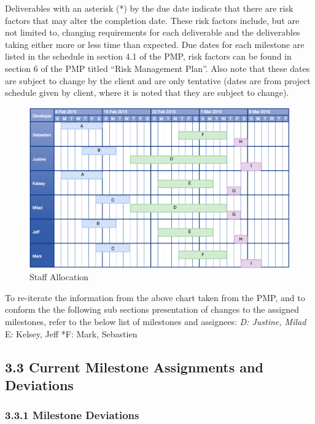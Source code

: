 \documentclass[]{article}
\begin{document}
Deliverables with an asterisk (*) by the due date indicate that there
are risk factors that may alter the completion date. These risk factors
include, but are not limited to, changing requirements for each
deliverable and the deliverables taking either more or less time than
expected. Due dates for each milestone are listed in the schedule in
section 4.1 of the PMP, risk factors can be found in section 6 of the
PMP titled ``Risk Management Plan''. Also note that these dates are
subject to change by the client and are only tentative (dates are from
project schedule given by client, where it is noted that they are
subject to change).


\begin{figure}[htbp]
\centering
\includegraphics{StaffAllocation.png}
\caption{Staff Allocation}
\end{figure}

To re-iterate the information from the above chart taken from the PMP,
and to conform the the following sub sections presentation of changes to
the assigned milestones, refer to the below list of milestones and
assignees: \emph{D: Justine, Milad }E: Kelsey, Jeff *F: Mark, Sebastien

\subsection{3.3 Current Milestone Assignments and
Deviations}\label{current-milestone-assignments-and-deviations}

\subsubsection{3.3.1 Milestone
Deviations}\label{milestone-deviations}
\end{document}
